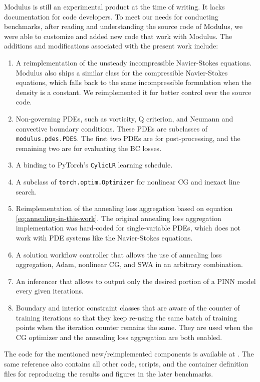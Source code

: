 Modulus is still an experimental product at the time of writing.
It lacks documentation for code developers. 
To meet our needs for conducting benchmarks, after reading and understanding the source code of Modulus, we were able to customize and added new code that work with Modulus.
The additions and modifications associated with the present work include:
\begin{enumerate}[nolistsep]
    \item A reimplementation of the unsteady incompressible Navier-Stokes equations.
        Modulus also ships a similar class for the compressible Navier-Stokes equations, which falls back to the same incompressible formulation when the density is a constant.
        We reimplemented it for better control over the source code.
    \item Non-governing PDEs, such as vorticity, Q criterion, and Neumann and convective boundary conditions.
        These PDEs are subclasses of \lstinline{modulus.pdes.PDES}.
        The first two PDEs are for post-processing, and the remaining two are for evaluating the BC losses.
    \item A binding to PyTorch's \lstinline{CylicLR} learning schedule.
    \item A subclass of \lstinline{torch.optim.Optimizer} for nonlinear CG and inexact line search.
    \item Reimplementation of the annealing loss aggregation based on equation \eqref{eq:annealing-in-this-work}.
        The original annealing loss aggregation implementation was hard-coded for single-variable PDEs, which does not work with PDE systems like the Navier-Stokes equations.
    \item A solution workflow controller that allows the use of annealing loss aggregation, Adam, nonlinear CG, and SWA in an arbitrary combination. 
    \item An inferencer that allows to output only the desired portion of a PINN model every given iterations. 
    \item Boundary and interior constraint classes that are aware of the counter of training iterations so that they keep re-using the same batch of training points when the iteration counter remains the same.
    They are used when the CG optimizer and the annealing loss aggregation are both enabled.
\end{enumerate}

The code for the mentioned new/reimplemented components is available at \cite{chuang_dissertation_nodate}.
The same reference also contains all other code, scripts, and the container definition files for reproducing the results and figures in the later benchmarks.
